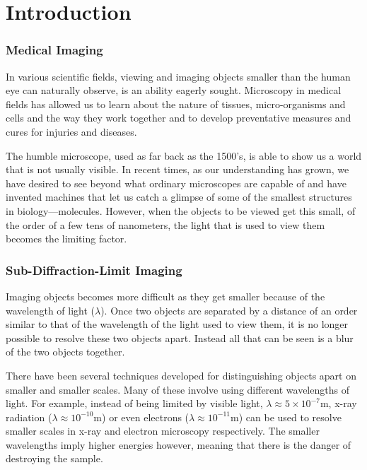 \part{Introduction}
\label{prt:introduction}

\section{Medical Imaging}
\label{sec:section_name}

In various scientific fields, viewing and imaging objects smaller than the
human eye can naturally observe, is an ability eagerly sought. Microscopy in
medical fields has allowed us to learn about the nature of tissues,
micro-organisms and cells and the way they work together and to develop
preventative measures and cures for injuries and diseases.

The humble microscope, used as far back as the 1500's, is able to show us a
world that is not usually visible. In recent times, as our understanding has
grown, we have desired to see beyond what ordinary microscopes are capable of
and have invented machines that let us catch a glimpse of some of the smallest
structures in biology---molecules. However, when the objects to be viewed get
this small, of the order of a few tens of nanometers, the light that is used to
view them becomes the limiting factor.

\section{Sub-Diffraction-Limit Imaging}
\label{sec:sub_diffraction_limit_imaging}

Imaging objects becomes more difficult as they get smaller because of the
wavelength of light ($\lambda$). Once two objects are separated by a distance
of an order similar to that of the wavelength of the light used to view them,
it is no longer possible to resolve these two objects apart. Instead all that
can be seen is a blur of the two objects together.

There have been several techniques developed for distinguishing objects apart
on smaller and smaller scales. Many of these involve using different
wavelengths of light.  For example, instead of being limited by visible light,
$\lambda \approx 5\times 10^{-7} \textrm{m}$, x-ray radiation ($\lambda \approx
10^{-10} \textrm{m}$) or even electrons ($\lambda \approx 10^{-11} \textrm{m}$)
can be used to resolve smaller scales in x-ray and electron microscopy
respectively. The smaller wavelengths imply higher energies however, meaning
that there is the danger of destroying the sample.

